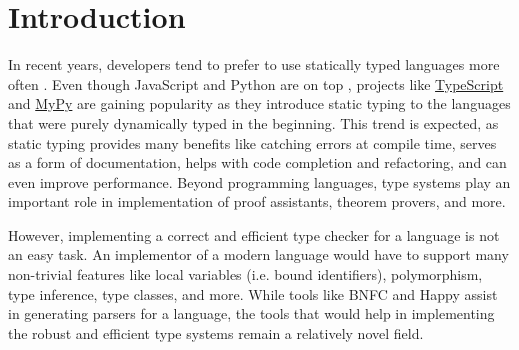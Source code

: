 \chapter{Introduction}
\label{chap:intro}


In recent years, developers tend to prefer to use statically typed languages more often \cite{SODevSurvey2022} \cite{SODevSurvey2023} \cite{SODevSurvey2024}.
Even though JavaScript and Python are on top \cite{SODevSurvey2024}, projects like \href{https://www.typescriptlang.org/}{TypeScript} and \href{https://mypy-lang.org/}{MyPy} are gaining popularity as they introduce static typing to the languages that were purely dynamically typed in the beginning.
This trend is expected, as static typing provides many benefits like catching errors at compile time, serves as a form of documentation, helps with code completion and refactoring, and can even improve performance.
Beyond programming languages, type systems play an important role in implementation of proof assistants, theorem provers, and more.


However, implementing a correct and efficient type checker for a language is not an easy task.
An implementor of a modern language would have to support many non-trivial features like local variables (i.e. bound identifiers), polymorphism, type inference, type classes, and more.
While tools like BNFC \cite{BNFC} and Happy \cite{haskell_happy} assist in generating parsers for a language, the tools that would help in implementing the robust and efficient type systems remain a relatively novel field.



